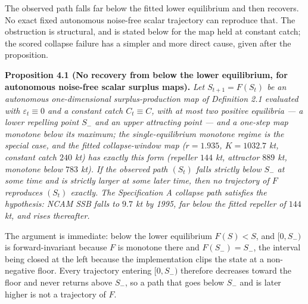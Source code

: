 \documentclass[11pt]{article}
\begin{document}
The observed path falls far below the fitted lower equilibrium and then
recovers. No exact fixed autonomous noise-free scalar trajectory can
reproduce that. The obstruction is structural, and is stated below for
the map held at constant catch; the scored collapse failure has a
simpler and more direct cause, given after the proposition.

\textbf{Proposition 4.1 (No recovery from below the lower equilibrium,
for autonomous noise-free scalar surplus maps).} \emph{Let
\(S_{t+1}=F(S_t)\) be an autonomous one-dimensional surplus-production
map of Definition 2.1 evaluated with \(\varepsilon_t \equiv 0\) and a
constant catch \(C_t \equiv C\), with at most two positive equilibria --- a lower
repelling point \(S_-\) and an upper attracting point --- and a one-step
map monotone below its maximum; the single-equilibrium monotone regime
is the special case, and the fitted collapse-window map (\(r = 1.935\),
\(K = 1032.7\) kt, constant catch \(240\) kt) has exactly this form
(repeller \(144\) kt, attractor \(889\) kt, monotone below \(783\) kt).
If the observed path \((S_t)\) falls strictly below \(S_-\) at some
time and is strictly larger at some later time, then no trajectory of
\(F\) reproduces \((S_t)\) exactly. The Specification A collapse path
satisfies the hypothesis: NCAM SSB falls to \(9.7\) kt by 1995, far
below the fitted repeller of \(144\) kt, and rises thereafter. }

The argument is immediate: below the lower equilibrium \(F(S) < S\), and
\([0, S_-)\) is forward-invariant because \(F\) is monotone there and
\(F(S_-) = S_-\), the interval being closed at the left because the
implementation clips the state at a non-negative floor. Every trajectory
entering \([0, S_-)\) therefore decreases toward the floor and never
returns above \(S_-\), so a path that goes below \(S_-\) and is later
higher is not a trajectory of \(F\).
\end{document}
